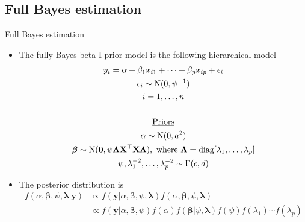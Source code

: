 \documentclass{beamer}\usepackage[]{graphicx}\usepackage[]{color}
\newcommand{\N}{\text{\normalfont N}}
\begin{document}
\subsection{Full Bayes estimation}

\begin{frame}{Full Bayes estimation}
	\begin{itemize}
		\item The fully Bayes beta I-prior model is the following hierarchical model
		\begin{align}\label{eq:betaiprior2}
			\begin{gathered}
				y_i = \alpha + \beta_1 x_{i1} + \dots + \beta_p x_{ip} + \epsilon_i \\
				\epsilon_i \sim \text{N}(0, \psi^{-1})  \\
				i=1,\dots,n \\
				\\
				\text{\underline{Priors}} \\
				\alpha \sim \N(0, a^2) \\
				\boldsymbol\beta \sim \N(\mathbf 0, \psi\boldsymbol\Lambda \mathbf X ^\top \mathbf X \boldsymbol\Lambda), \text{ where } \boldsymbol\Lambda = \text{diag}[\lambda_1, \dots, \lambda_p] \\
				\psi, \lambda_1^{-2}, \dots,  \lambda_p^{-2} \sim \Gamma(c,d) \\
			\end{gathered}
		\end{align}

		\item The posterior distribution is
		\begin{align*}
			f(\alpha, \boldsymbol{\beta}, \psi, \boldsymbol{\lambda} | \mathbf y)
			&\propto f(\mathbf y | \alpha, \boldsymbol{\beta}, \psi, \boldsymbol{\lambda}) f(\alpha, \boldsymbol{\beta}, \psi, \boldsymbol{\lambda}) \\
			&\propto f(\mathbf y | \alpha, \boldsymbol{\beta}, \psi) f(\alpha) f(\boldsymbol{\beta} | \psi, \boldsymbol{\lambda}) f(\psi) f(\lambda_1)\cdots f(\lambda_p)
		\end{align*}
	\end{itemize}
\end{frame}

\end{document}
